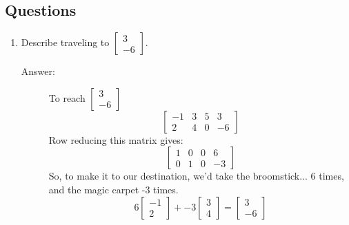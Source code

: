 \documentclass{article}
\begin{document}
            \subsection{Questions}
                \renewcommand{\labelenumi}{\alph{enumi}}
                \begin{enumerate}
                    \item 
                        Describe traveling to $\begin{bmatrix}3\\-6\end{bmatrix}$.
                        \begin{description}
                            \item[Answer:] 
                                To reach $\begin{bmatrix}3\\-6\end{bmatrix}$
                                \[
                                \left[
                                    \begin{array}{ccc|c}
                                    -1 & 3 & 5 & 3 \\
                                    2 & 4 & 0 & -6
                                    \end{array}
                                \right]
                                \]
                                Row reducing this matrix gives:
                                \[
                                \left[
                                    \begin{array}{ccc|c}
                                    1 & 0 & 0 & 6 \\
                                    0 & 1 & 0 & -3
                                    \end{array}
                                \right]
                                \]
                                So, to make it to our destination, we'd take the broomstick... 6 times,
                                and the magic carpet -3 times.
                                \[
                                6\begin{bmatrix}-1 \\ 2\end{bmatrix} + -3\begin{bmatrix}3 \\ 4\end{bmatrix} = \begin{bmatrix}3 \\ -6\end{bmatrix}
\]
\end{description}
\end{enumerate}
\end{document}
